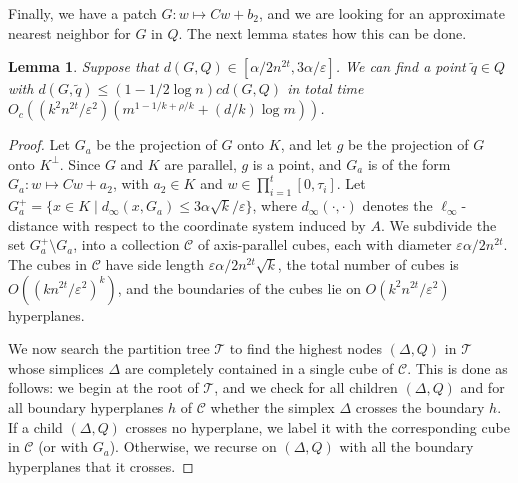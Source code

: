 \documentclass[a4paper,11pt]{paper}
\newcommand{\eps}{\varepsilon}
\newtheorem{lemma}[theorem]{Lemma}
\begin{document}
Finally, we have a patch $G: w \mapsto Cw + b_2$, and we are
looking for an approximate nearest neighbor for $G$ in $Q$.
The next lemma states how this can be done.
\begin{lemma}\label{lem:patch_NN}
  Suppose that $d(G, Q) \in [\alpha/2n^{2t},
    3\alpha/\eps]$. We can find a point
    $\widetilde{q} \in Q$ with
    $d(G, \widetilde{q}) \leq (1 - 1/2\log n)c d(G, Q)$
    in total time
    $O_c((k^2n^{2t}/\eps^2)(m^{1-1/k+\rho/k} + (d/k)\log m))$.
\end{lemma}
\begin{proof}
  Let $G_a$ be the projection  of $G$ onto $K$, and let
  $g$ be the projection of $G$ onto $K^\perp$.
  Since $G$ and $K$ are parallel,
  $g$ is a point, and
  $G_a$ is of the form $G_a : w \mapsto Cw + a_2$, with
  $a_2 \in K$ and $w \in \prod_{i=1}^t [0, \tau_i]$.
  Let $G_{a}^+ =
  \{x \in K \mid d_\infty(x, G_a) \leq
  3\alpha\sqrt{k}/\eps\}$, where
  $d_\infty(\cdot, \cdot)$ denotes the
  $\ell_\infty$-distance with respect to the coordinate system induced
  by $A$.
  We subdivide the set $G_a^+ \setminus G_a$,
  into a collection $\mathcal{C}$ of
  axis-parallel cubes, each with diameter
  $\eps\alpha/2n^{2t}$.
  The cubes in $\mathcal{C}$
  have side length $\eps\alpha/2n^{2t}\sqrt{k}$,
  the total number of cubes is
  $O((kn^{2t}/\eps^2)^k)$, and the
  boundaries of the cubes lie on
  $O(k^2n^{2t}/\eps^2)$ hyperplanes.

  We now search the partition tree $\mathcal{T}$
  to find the highest nodes $(\Delta, Q)$ in
  $\mathcal{T}$  whose simplices $\Delta$ are completely contained
  in a single cube of $\mathcal{C}$.
  This is done as follows: we begin at the root
  of $\mathcal{T}$, and we check for all children $(\Delta, Q)$
  and for all boundary hyperplanes $h$ of $\mathcal{C}$
  whether the simplex $\Delta$ crosses the boundary $h$.
  If a child $(\Delta, Q)$ crosses no hyperplane, we label it
  with the corresponding cube in $\mathcal{C}$ (or with $G_a$).
  Otherwise, we recurse on $(\Delta, Q)$
  with all the boundary hyperplanes that it crosses.


\end{proof}
\end{document}
